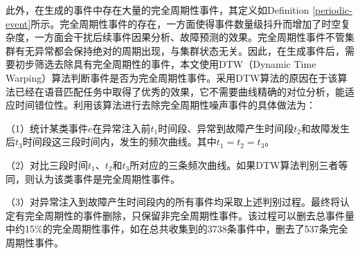 
此外，在生成的事件中存在大量的完全周期性事件，其定义如Definition \ref{periodic-event}所示。完全周期性事件的存在，一方面使得事件数量级抖升而增加了时空复杂度，一方面会干扰后续事件因果分析、故障预测的效果。完全周期性事件不管集群有无异常都会保持绝对的周期出现，与集群状态无关。因此，在生成事件后，需要初步筛选去除具有完全周期性的事件，本文使用DTW（Dynamic Time Warping）算法\cite{mueen2016extracting}判断事件是否为完全周期性事件。采用DTW算法的原因在于该算法已经在语音匹配任务中取得了优秀的效果，它不需要曲线精确的对位分析，能适应时间错位性。利用该算法进行去除完全周期性噪声事件的具体做法为：

（1）统计某类事件$e$在异常注入前$t_1$时间段、异常到故障产生时间段$t_2$和故障发生后$t_{3}$时间段这三段时间内，发生的频次曲线。其中$t_1 = t_2 = t_3$。

（2）对比三段时间$t_1$、$t_2$和$t_{3}$所对应的三条频次曲线。如果DTW算法判别三者等同，则认为该类事件是完全周期性事件。

（3）对异常注入到故障产生时间段内的所有事件均采取上述判别过程。最终将认定有完全周期性的事件删除，只保留非完全周期性事件。该过程可以删去总事件量中约15\%的完全周期性事件，如在总共收集到的3738条事件中，删去了537条完全周期性事件。

